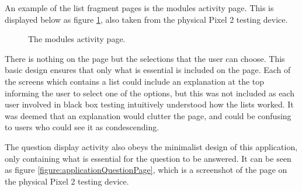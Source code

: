 \documentclass{article}
\begin{document}
An example of the list fragment pages is the modules activity page. This is displayed below as figure \ref{figure:applicationModulesPage}, also taken from the physical Pixel 2 testing device. 

\begin{figure}[H]
	\centering
	\caption{The modules activity page.}
	\label{figure:applicationModulesPage}
\end{figure}

There is nothing on the page but the selections that the user can choose. This basic design ensures that only what is essential is included on the page. Each of the screens which contains a list could include an explanation at the top informing the user to select one of the options, but this was not included as each user involved in black box testing intuitively understood how the lists worked. It was deemed that an explanation would clutter the page, and could be confusing to users who could see it as condescending. \par

The question display activity also obeys the minimalist design of this application, only containing what is essential for the question to be answered. It can be seen as figure \ref{figure:applicationQuestionPage}, which is a screenshot of the page on the physical Pixel 2 testing device.
\end{document}
